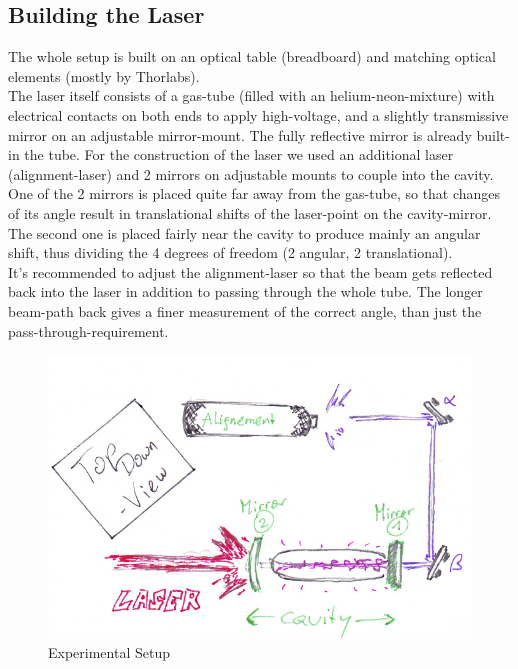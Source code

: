 \documentclass[12pt,a4paper]{article}
\begin{document}
\begin{multicols}{2}
\subsection{Building the Laser}
The whole setup is built on an optical table (breadboard) and matching optical elements (mostly by Thorlabs).\\
The laser itself consists of a gas-tube (filled with an helium-neon-mixture) with electrical contacts on both ends to apply high-voltage, and a slightly transmissive mirror on an adjustable mirror-mount. The fully reflective mirror is already built-in the tube.
For the construction of the laser we used an additional laser (alignment-laser) and 2 mirrors on adjustable mounts to couple into the cavity.\\
One of the 2 mirrors is placed quite far away from the gas-tube, so that changes of its angle result in translational shifts of the laser-point on the cavity-mirror. The second one is placed fairly near the cavity to produce mainly an angular shift, thus dividing the 4 degrees of freedom (2 angular, 2 translational).\\
It's recommended to adjust the alignment-laser so that the beam gets reflected back into the laser in addition to passing through the whole tube. The longer beam-path back gives a finer measurement of the correct angle, than just the pass-through-requirement.\\

\begin{figure}[H]
 \centering
 \includegraphics[scale=0.65]{./figures/exp_setup.png}
 \caption{Experimental Setup}
 \label{fig:exp_setup}
\end{figure}


\end{multicols}
\end{document}
